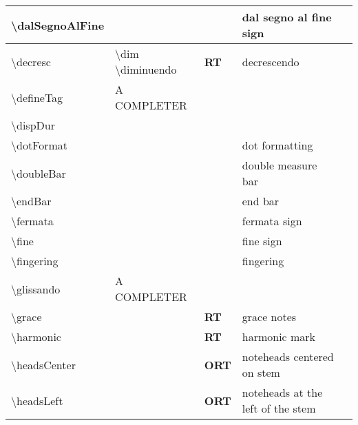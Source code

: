 \documentclass[11pt]{article}
\begin{document}
\begin{tabular}{lllll}
    \hline
    \textbackslash{}dalSegnoAlFine&&&dal segno al fine sign&\\
    \hline
    \textbackslash{}decresc&\textbackslash{}dim \textbackslash{}diminuendo&\textbf{RT}&decrescendo&\\
    \hline
    \textbackslash{}defineTag&A COMPLETER&&&\\
    \hline
    \textbackslash{}dispDur&&&&\\
    \hline
    \textbackslash{}dotFormat&&&dot formatting&\\
    \hline
    \textbackslash{}doubleBar&&&double measure bar&\\
    \hline
    \textbackslash{}endBar&&&end bar&\\
    \hline
    \textbackslash{}fermata&&&fermata sign&\\
    \hline
    \textbackslash{}fine&&&fine sign&\\
    \hline
    \textbackslash{}fingering&&&fingering&\\
    \hline
    \textbackslash{}glissando&A COMPLETER&&&\\
    \hline
    \textbackslash{}grace&&\textbf{RT}&grace notes&\\
    \hline
    \textbackslash{}harmonic&&\textbf{RT}&harmonic mark&\\
    \hline
    \textbackslash{}headsCenter&&\textbf{ORT}&noteheads centered on stem&\\
    \hline
    \textbackslash{}headsLeft&&\textbf{ORT}&noteheads at the left of the stem&\\
    \hline
\end{tabular}
%
%
\end{document}
